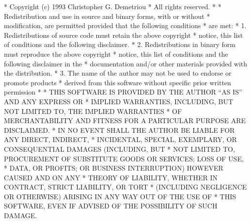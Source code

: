 \begin{copyrightEnv}
 * Copyright (c) 1993 Christopher G. Demetriou
 * All rights reserved.
 *
 * Redistribution and use in source and binary forms, with or without
 * modification, are permitted provided that the following conditions
 * are met:
 * 1. Redistributions of source code must retain the above copyright
 *    notice, this list of conditions and the following disclaimer.
 * 2. Redistributions in binary form must reproduce the above copyright
 *    notice, this list of conditions and the following disclaimer in the
 *    documentation and/or other materials provided with the distribution.
 * 3. The name of the author may not be used to endorse or promote products
 *    derived from this software without specific prior written permission
 *
 * THIS SOFTWARE IS PROVIDED BY THE AUTHOR ``AS IS'' AND ANY EXPRESS OR
 * IMPLIED WARRANTIES, INCLUDING, BUT NOT LIMITED TO, THE IMPLIED WARRANTIES
 * OF MERCHANTABILITY AND FITNESS FOR A PARTICULAR PURPOSE ARE DISCLAIMED.
 * IN NO EVENT SHALL THE AUTHOR BE LIABLE FOR ANY DIRECT, INDIRECT,
 * INCIDENTAL, SPECIAL, EXEMPLARY, OR CONSEQUENTIAL DAMAGES (INCLUDING, BUT
 * NOT LIMITED TO, PROCUREMENT OF SUBSTITUTE GOODS OR SERVICES; LOSS OF USE,
 * DATA, OR PROFITS; OR BUSINESS INTERRUPTION) HOWEVER CAUSED AND ON ANY
 * THEORY OF LIABILITY, WHETHER IN CONTRACT, STRICT LIABILITY, OR TORT
 * (INCLUDING NEGLIGENCE OR OTHERWISE) ARISING IN ANY WAY OUT OF THE USE OF
 * THIS SOFTWARE, EVEN IF ADVISED OF THE POSSIBILITY OF SUCH DAMAGE.
\end{copyrightEnv}

